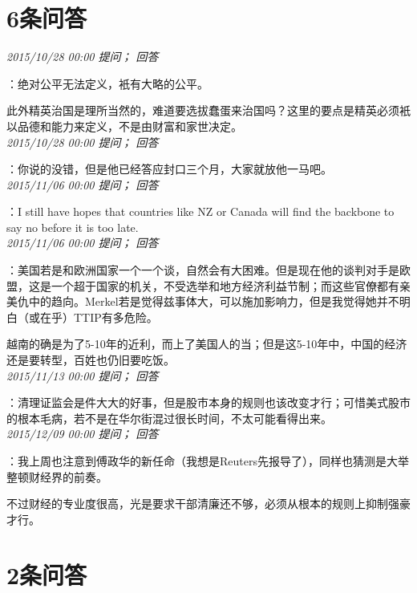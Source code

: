 \documentclass[twocolumn]{ctexart}
\begin{document}
\section{6条问答}

\textit{\hfill\noindent\small 2015/10/28 00:00 提问； 回答}

：绝对公平无法定义，衹有大略的公平。

此外精英治国是理所当然的，难道要选拔蠢蛋来治国吗？这里的要点是精英必须衹以品德和能力来定义，不是由财富和家世决定。\\

\textit{\hfill\noindent\small 2015/10/28 00:00 提问； 回答}

：你说的没错，但是他已经答应封口三个月，大家就放他一马吧。\\

\textit{\hfill\noindent\small 2015/11/06 00:00 提问； 回答}

：I still have hopes that countries like NZ or Canada will find the backbone to say no before it is too late.\\

\textit{\hfill\noindent\small 2015/11/06 00:00 提问； 回答}

：美国若是和欧洲国家一个一个谈，自然会有大困难。但是现在他的谈判对手是欧盟，这是一个超于国家的机关，不受选举和地方经济利益节制；而这些官僚都有亲美仇中的趋向。Merkel若是觉得兹事体大，可以施加影响力，但是我觉得她并不明白（或在乎）TTIP有多危险。

越南的确是为了5-10年的近利，而上了美国人的当；但是这5-10年中，中国的经济还是要转型，百姓也仍旧要吃饭。\\

\textit{\hfill\noindent\small 2015/11/13 00:00 提问； 回答}

：清理证监会是件大大的好事，但是股市本身的规则也该改变才行；可惜美式股市的根本毛病，若不是在华尔街混过很长时间，不太可能看得出来。\\

\textit{\hfill\noindent\small 2015/12/09 00:00 提问； 回答}

：我上周也注意到傅政华的新任命（我想是Reuters先报导了），同样也猜测是大举整顿财经界的前奏。

不过财经的专业度很高，光是要求干部清廉还不够，必须从根本的规则上抑制强豪才行。\\

\section{2条问答}
\end{document}
